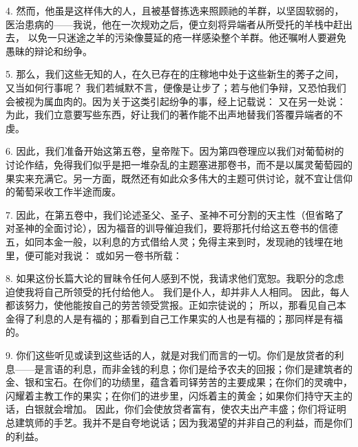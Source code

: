 4. 然而，他虽是这样伟大的人，且被基督拣选来照顾祂的羊群，以坚固软弱的，医治患病的——我说，他在一次规劝之后，便立刻将异端者从所受托的羊栈中赶出去， 以免一只迷途之羊的污染像蔓延的疮一样感染整个羊群。他还嘱咐人要避免愚昧的辩论和纷争。\par

5. 那么，我们这些无知的人，在久已存在的庄稼地中处于这些新生的莠子之间，又当如何行事呢？ 我们若缄默不言，便像是让步了；若与他们争辩，又恐怕我们会被视为属血肉的。因为关于这类引起纷争的事，经上记载说：  又在另一处说：  为此，我们立意要写些东西，好让我们的著作能不出声地替我们答覆异端者的不虔。\par

6. 因此，我们准备开始这第五卷，皇帝陛下。因为第四卷理应以我们对葡萄树的讨论作结，免得我们似乎是把一堆杂乱的主题塞进那卷书，而不是以属灵葡萄园的果实来充满它。另一方面，既然还有如此众多伟大的主题可供讨论，就不宜让信仰的葡萄采收工作半途而废。\par

7. 因此，在第五卷中，我们论述圣父、圣子、圣神不可分割的天主性（但省略了对圣神的全面讨论），因为福音的训导催迫我们，要将那托付给这五卷书的信德五，如同本金一般，以利息的方式借给人灵；免得主来到时，发现祂的钱埋在地里，便可能对我说：  或如另一卷书所载： \par

8. 如果这份长篇大论的冒昧令任何人感到不悦，我请求他们宽恕。我职分的念虑迫使我将自己所领受的托付给他人。  我们是仆人，却并非人人相同。  因此，每人都该努力，使他能按自己的劳苦领受赏报。正如宗徒说的；  所以，那看见自己本金得了利息的人是有福的；那看到自己工作果实的人也是有福的；那同样是有福的。\par

9. 你们这些听见或读到这些话的人，就是对我们而言的一切。你们是放贷者的利息——是言语的利息，而非金钱的利息；你们是给予农夫的回报；你们是建筑者的金、银和宝石。在你们的功绩里，蕴含着司铎劳苦的主要成果；在你们的灵魂中，闪耀着主教工作的果实；在你们的进步里，闪烁着主的黄金；如果你们持守天主的话，白银就会增加。 因此，你们会使放贷者富有，使农夫出产丰盛；你们将证明总建筑师的手艺。我并不是自夸地说话；因为我渴望的并非自己的利益，而是你们的利益。\par

